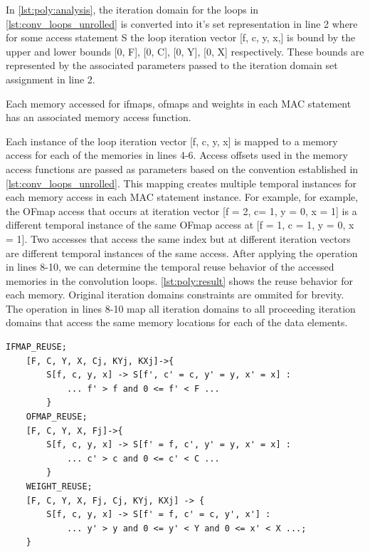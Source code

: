 In \autoref{lst:poly:analysis}, the iteration domain for the loops in
\autoref{lst:conv_loops_unrolled} is converted into it's set representation in
line 2 where for some access statement S the loop iteration vector [f, c, y, x,]
is bound by the upper and lower bounds [0, F], [0, C], [0, Y], [0, X]
respectively. These bounds are represented by the associated parameters passed
to the iteration domain set assignment in line 2. 

Each memory accessed for ifmaps, ofmaps and weights in each MAC statement has
an associated memory access function. 

Each instance of the loop iteration vector [f, c, y, x]
is mapped to a memory access for each of the memories in lines 4-6. Access
offsets used in the memory access functions are passed as parameters based on
the convention established in \autoref{lst:conv_loops_unrolled}. This mapping
creates multiple temporal instances for each memory access in each \ac{MAC}
statement instance.  For
example, for example, the OFmap access that occurs at iteration vector [f = 2, c= 1, y = 0,
x = 1] is a different temporal instance of the same OFmap access at [f = 1, c = 1,
y = 0, x = 1]. 
Two accesses that access the same index but at different
iteration vectors are different temporal instances of the same access.
After applying the operation in lines 8-10, we can determine the
temporal reuse behavior of the accessed memories in the convolution loops.  
\autoref{lst:poly:result} shows the reuse behavior for each memory. Original
iteration domains constraints are ommited for brevity. The operation in lines
8-10 map all iteration domains to all proceeding iteration domains that access
the same memory locations for each of the data elements.

\clearpage
\begin{lstlisting}[caption=Polyhedral analysis results w.r.t data elements in convolution loops, label={lst:poly:result}]
    IFMAP_REUSE;
    [F, C, Y, X, Cj, KYj, KXj]->{
        S[f, c, y, x] -> S[f', c' = c, y' = y, x' = x] :
            ... f' > f and 0 <= f' < F ... 
        }
    OFMAP_REUSE;
    [F, C, Y, X, Fj]->{ 
        S[f, c, y, x] -> S[f' = f, c', y' = y, x' = x] : 
            ... c' > c and 0 <= c' < C ... 
        }
    WEIGHT_REUSE;
    [F, C, Y, X, Fj, Cj, KYj, KXj] -> { 
        S[f, c, y, x] -> S[f' = f, c' = c, y', x'] : 
            ... y' > y and 0 <= y' < Y and 0 <= x' < X ...; 
    }
\end{lstlisting}

